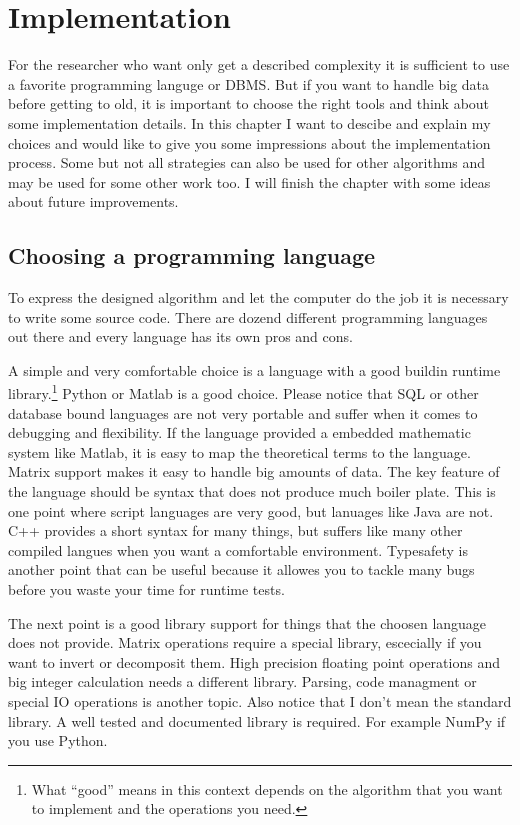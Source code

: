 \chapter{Implementation}\label{chap:implementation}
For the researcher who want only get a described complexity it is sufficient to use a favorite programming languge or DBMS. But if you want to handle big data before getting to old, it is important to choose the right tools and think about some implementation details. In this chapter I want to descibe and explain my choices and would like to give you some impressions about the implementation process. Some but not all strategies can also be used for other algorithms and may be used for some other work too. I will finish the chapter with some ideas about future improvements.

\section{Choosing a programming language}
To express the designed algorithm and let the computer do the job it is necessary to write some source code. There are dozend different programming languages out there and every language has its own pros and cons.

A simple and very comfortable choice is a language with a good buildin runtime library.\footnote{What ``good'' means in this context depends on the algorithm that you want to implement and the operations you need.} Python or Matlab is a good choice. Please notice that SQL or other database bound languages are not very portable and suffer when it comes to debugging and flexibility. If the language provided a embedded mathematic system like Matlab, it is easy to map the theoretical terms to the language. Matrix support makes it easy to handle big amounts of data. The key feature of the language should be syntax that does not produce much boiler plate. This is one point where script languages are very good, but lanuages like Java are not. C++ provides a short syntax for many things, but suffers like many other compiled langues when you want a comfortable environment. Typesafety is another point that can be useful because it allowes you to tackle many bugs before you waste your time for runtime tests.

The next point is a good library support for things that the choosen language does not provide. Matrix operations require a special library, escecially if you want to invert or decomposit them. High precision floating point operations and big integer calculation needs a different library. Parsing, code managment or special IO operations is another topic. Also notice that I don't mean the standard library. A well tested and documented library is required. For example NumPy if you use Python.

